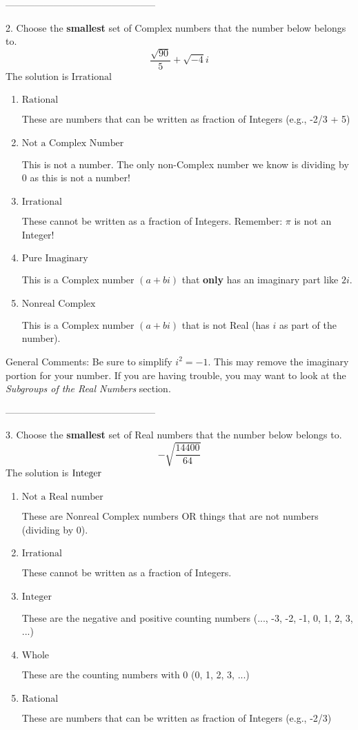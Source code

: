 \documentclass{extbook}[14pt]
\begin{document}
-----------------------------------------------

2. Choose the \textbf{smallest} set of Complex numbers that the number below belongs to.
\[ \frac{\sqrt{90}}{5}+\sqrt{-4}i \] 
The solution is $ \text{Irrational} $ 

\begin{enumerate}[label=\Alph*.] 
\item $ \text{Rational} $ 

 These are numbers that can be written as fraction of Integers (e.g., -2/3 + 5) 
\item $ \text{Not a Complex Number} $ 

 This is not a number. The only non-Complex number we know is dividing by 0 as this is not a number! 
\item $ \text{Irrational} $ 

 These cannot be written as a fraction of Integers. Remember: $\pi$ is not an Integer! 
\item $ \text{Pure Imaginary} $ 

 This is a Complex number $(a+bi)$ that \textbf{only} has an imaginary part like $2i$. 
\item $ \text{Nonreal Complex} $ 

 This is a Complex number $(a+bi)$ that is not Real (has $i$ as part of the number). 
\end{enumerate} 
 
General Comments: Be sure to simplify $i^2 = -1$. This may remove the imaginary portion for your number. If you are having trouble, you may want to look at the \textit{Subgroups of the Real Numbers} section.

-----------------------------------------------

3. Choose the \textbf{smallest} set of Real numbers that the number below belongs to.
\[ -\sqrt{\frac{14400}{64}} \] 
The solution is $ \text{\text{Integer}} $ 

\begin{enumerate}[label=\Alph*.] 
\item $ \text{Not a Real number} $ 

 These are Nonreal Complex numbers OR things that are not numbers (dividing by 0). 
\item $ \text{Irrational} $ 

 These cannot be written as a fraction of Integers. 
\item $ \text{Integer} $ 

 These are the negative and positive counting numbers (..., -3, -2, -1, 0, 1, 2, 3, ...) 
\item $ \text{Whole} $ 

 These are the counting numbers with 0 (0, 1, 2, 3, ...) 
\item $ \text{Rational} $ 

 These are numbers that can be written as fraction of Integers (e.g., -2/3) 
\end{enumerate} 
 
\end{document}
